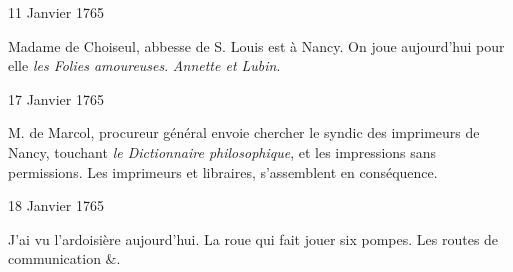                      \begin{diary}{11 Janvier 1765}{}
                        
                        
                           Madame de Choiseul, abbesse de S. Louis est à
                           Nancy. On joue aujourd'hui
                           pour elle \emph{les
                              Folies amoureuses}. \emph{Annette et
                              Lubin}. \bigskip
        
        
                     \end{diary}

                     \begin{diary}{17 Janvier 1765}{}
                        
                        
                           M. de Marcol, procureur général
                           envoie chercher le syndic
                           des imprimeurs de Nancy,
                           touchant \emph{le Dictionnaire
                              philosophique}, et les impressions sans permissions.
                           Les imprimeurs et libraires, s'assemblent en conséquence. \bigskip
        
        
                     \end{diary}

                     \begin{diary}{18 Janvier 1765}{}
                        
                        
                           J'ai vu l'ardoisière
                           aujourd'hui. La roue qui
                           fait jouer six pompes. Les routes de communication &. \bigskip
        
        
                     \end{diary}

